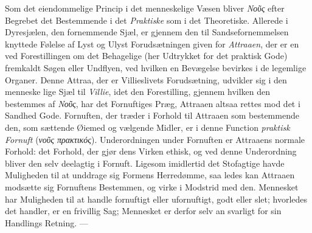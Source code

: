 \documentclass[12pt,a4paper]{book}
\newcommand{\gk}[1]{\textit{#1}}
\begin{document}
Som det eiendommelige Princip i det menneskelige Væsen
bliver \gk{Νοῦς} efter Begrebet det Bestemmende i det \emph{Praktiske}
som i det Theoretiske. Allerede i Dyresjælen, den fornemmende
Sjæl, er gjennem den til Sandsefornemmelsen knyttede Følelse
af Lyst og Ulyst Forudsætningen given for \emph{Attraaen}, der
er en ved Forestillingen om det Behagelige (her Udtrykket for
det praktisk Gode) fremkaldt Søgen eller Undflyen, ved hvilken
en Bevægelse bevirkes i de legemlige Organer. Denne Attraa,
der er Villieslivets Forudsætning, udvikler sig i den menneske\-%
lige Sjæl til \emph{Villie}, idet den Forestilling, gjennem hvilken
den bestemmes af \gk{Νοῦς}, har det Fornuftiges Præg, Attraaen
altsaa rettes mod det i Sandhed Gode. Fornuften, der træder
i Forhold til Attraaen som bestemmende den, som sættende
Øiemed og vælgende Midler, er i denne Function \emph{praktisk
Fornuft} (\gk{νοῦς πρακτικός}). Underordningen under Fornuften
er Attraaens normale Forhold: det Forhold, der gjør dens
Virken ethisk, og ved denne Underordning bliver den selv
deelagtig i Fornuft. Ligesom imidlertid det Stofagtige havde
Muligheden til at unddrage sig Formens Herredømme, saa\-%
ledes kan Attraaen modsætte sig Fornuftens Bestemmen, og
virke i Modstrid med den. Mennesket har Muligheden til at
handle fornuftigt eller ufornuftigt, godt eller slet; hvorledes
det handler, er en frivillig Sag; Mennesket er derfor selv an\-%
svarligt for sin Handlings Retning. ---
\end{document}

